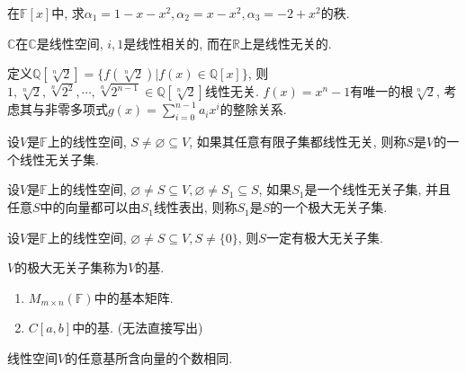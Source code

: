\begin{example}
    在$\mathbb{F}[x]$中, 求$\alpha{_1}=1-x-x^2, \alpha{_2}=x-x^2, \alpha{_3}=-2+x^2$的秩.
\end{example}

\begin{example}
    $\mathbb{C}$在$\mathbb{C}$是线性空间, $i, 1$是线性相关的, 而在$\mathbb{R}$上是线性无关的.
\end{example}

\begin{example}
    定义$\mathbb{Q}[\sqrt[n]{2}]=\{f(\sqrt[n]{2})|f(x)\in \mathbb{Q}[x]\}$, 则$1, \sqrt[n]{2}, \sqrt[n]{2^2}, \cdots, \sqrt[n]{2^{n-1}} \in \mathbb{Q}[\sqrt[n]{2}]$线性无关.
    $f(x)=x^n-1$有唯一的根$\sqrt[n]{2}$, 考虑其与非零多项式$g(x)=\sum^{n-1}_{i=0}a_ix^i$的整除关系.
\end{example}

\begin{definition}[线性无关子集]
    设$V$是$\mathbb{F}$上的线性空间, $S \ne \varnothing \subseteq V$, 如果其任意有限子集都线性无关, 则称$S$是$V$的一个线性无关子集.
\end{definition}

\begin{definition}[极大线性无关子集]
    设$V$是$\mathbb{F}$上的线性空间, $\varnothing \ne S \subseteq V, \varnothing \ne S_1 \subseteq S$, 如果$S_1$是一个线性无关子集, 并且任意$S$中的向量都可以由$S_1$线性表出, 则称$S_1$是$S$的一个极大无关子集.
\end{definition}

\begin{axiom}[基的存在性定理]
    设$V$是$\mathbb{F}$上的线性空间, $\varnothing \ne S \subseteq V, S \ne \{0\}$, 则$S$一定有极大无关子集.
\end{axiom}

\begin{definition}[基]
    $V$的极大无关子集称为$V$的基.
\end{definition}

\begin{example}
    \par
    \begin{enumerate}[itemindent=1em]
        \item $M_{m\times n}(\mathbb{F})$中的基本矩阵.
        \item $C[a, b]$中的基. (无法直接写出)
    \end{enumerate}
\end{example}

\begin{lemma}
    线性空间$V$的任意基所含向量的个数相同.
\end{lemma}

